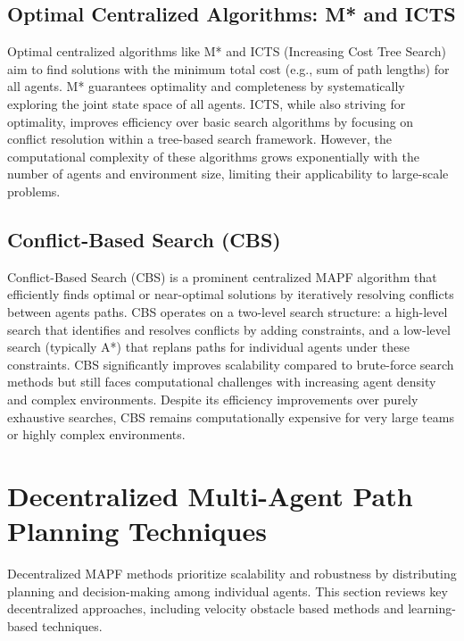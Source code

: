 \subsection{Optimal Centralized Algorithms: M* and ICTS}
Optimal centralized algorithms like M* \cite{Standley2011Complete}
and ICTS (Increasing Cost Tree Search) aim to find solutions with the minimum total cost (e.g., sum of path lengths) for all agents. M* guarantees optimality and completeness by systematically exploring the joint state space of all agents. ICTS, while also striving for optimality, improves efficiency over basic search algorithms by focusing on conflict resolution within a tree-based search framework. However, the computational complexity of these algorithms grows exponentially with the number of agents and environment size, limiting their applicability to large-scale problems.

\subsection{Conflict-Based Search (CBS)}
Conflict-Based Search (CBS) \cite{Sharon2015CBS}
is a prominent centralized MAPF algorithm that efficiently finds optimal or near-optimal solutions by iteratively resolving conflicts between agents paths. CBS operates on a two-level search structure: a high-level search that identifies and resolves conflicts by adding constraints, and a low-level search (typically A*) that replans paths for individual agents under these constraints. CBS significantly improves scalability compared to brute-force search methods but still faces computational challenges with increasing agent density and complex environments. Despite its efficiency improvements over purely exhaustive searches, CBS remains computationally expensive for very large teams or highly complex environments.

\section{Decentralized Multi-Agent Path Planning Techniques}
Decentralized MAPF methods prioritize scalability and robustness by distributing planning and decision-making among individual agents. This section reviews key decentralized approaches, including velocity obstacle based methods and learning-based techniques.

